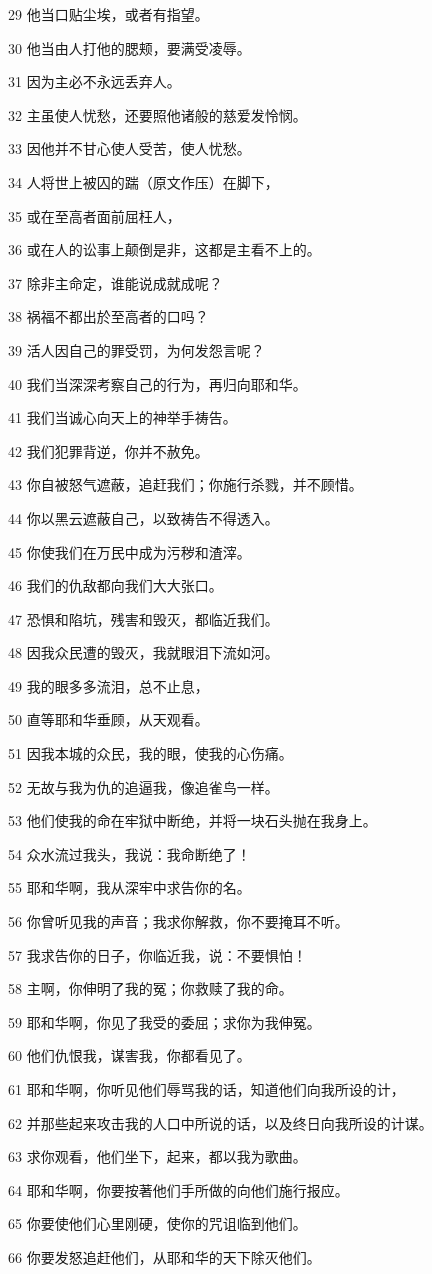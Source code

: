\par 29 他当口贴尘埃，或者有指望。
\par 30 他当由人打他的腮颊，要满受凌辱。
\par 31 因为主必不永远丢弃人。
\par 32 主虽使人忧愁，还要照他诸般的慈爱发怜悯。
\par 33 因他并不甘心使人受苦，使人忧愁。
\par 34 人将世上被囚的踹（原文作压）在脚下，
\par 35 或在至高者面前屈枉人，
\par 36 或在人的讼事上颠倒是非，这都是主看不上的。
\par 37 除非主命定，谁能说成就成呢？
\par 38 祸福不都出於至高者的口吗？
\par 39 活人因自己的罪受罚，为何发怨言呢？
\par 40 我们当深深考察自己的行为，再归向耶和华。
\par 41 我们当诚心向天上的神举手祷告。
\par 42 我们犯罪背逆，你并不赦免。
\par 43 你自被怒气遮蔽，追赶我们；你施行杀戮，并不顾惜。
\par 44 你以黑云遮蔽自己，以致祷告不得透入。
\par 45 你使我们在万民中成为污秽和渣滓。
\par 46 我们的仇敌都向我们大大张口。
\par 47 恐惧和陷坑，残害和毁灭，都临近我们。
\par 48 因我众民遭的毁灭，我就眼泪下流如河。
\par 49 我的眼多多流泪，总不止息，
\par 50 直等耶和华垂顾，从天观看。
\par 51 因我本城的众民，我的眼，使我的心伤痛。
\par 52 无故与我为仇的追逼我，像追雀鸟一样。
\par 53 他们使我的命在牢狱中断绝，并将一块石头抛在我身上。
\par 54 众水流过我头，我说：我命断绝了！
\par 55 耶和华啊，我从深牢中求告你的名。
\par 56 你曾听见我的声音；我求你解救，你不要掩耳不听。
\par 57 我求告你的日子，你临近我，说：不要惧怕！
\par 58 主啊，你伸明了我的冤；你救赎了我的命。
\par 59 耶和华啊，你见了我受的委屈；求你为我伸冤。
\par 60 他们仇恨我，谋害我，你都看见了。
\par 61 耶和华啊，你听见他们辱骂我的话，知道他们向我所设的计，
\par 62 并那些起来攻击我的人口中所说的话，以及终日向我所设的计谋。
\par 63 求你观看，他们坐下，起来，都以我为歌曲。
\par 64 耶和华啊，你要按著他们手所做的向他们施行报应。
\par 65 你要使他们心里刚硬，使你的咒诅临到他们。
\par 66 你要发怒追赶他们，从耶和华的天下除灭他们。

